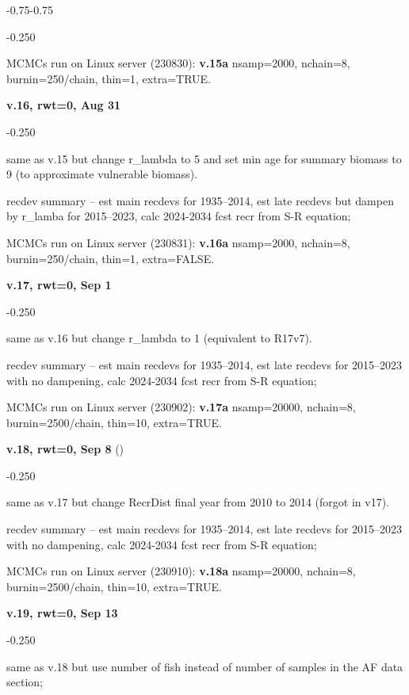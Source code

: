 \begin{itemize_csas}{-0.75}{-0.75}
\begin{itemize_csas}{-0.25}{0}
		\item MCMCs run on Linux server (230830): \textbf{v.15a} nsamp=2000, nchain=8, burnin=250/chain, thin=1, extra=TRUE.
	\end{itemize_csas}
	\item \textbf{v.16, rwt=0, Aug 31}
	\begin{itemize_csas}{-0.25}{0}
		\item same as v.15 but change r\_lambda to 5 and set min age for summary biomass to 9 (to approximate vulnerable biomass).
		\item recdev summary -- est main recdevs for 1935--2014, est late recdevs but dampen by r\_lamba for 2015--2023, calc 2024-2034 fcst recr from S-R equation;
		\item MCMCs run on Linux server (230831): \textbf{v.16a} nsamp=2000, nchain=8, burnin=250/chain, thin=1, extra=FALSE.
	\end{itemize_csas}
	\item \textbf{v.17, rwt=0, Sep 1}
	\begin{itemize_csas}{-0.25}{0}
		\item same as v.16 but change r\_lambda to 1 (equivalent to R17v7).
		\item recdev summary -- est main recdevs for 1935--2014, est late recdevs for 2015--2023 with no dampening, calc 2024-2034 fcst recr from S-R equation;
		\item MCMCs run on Linux server (230902): \textbf{v.17a} nsamp=20000, nchain=8, burnin=2500/chain, thin=10, extra=TRUE.
	\end{itemize_csas}
	\item \textbf{v.18, rwt=0, Sep 8}  ()
	\begin{itemize_csas}{-0.25}{0}
		\item same as v.17 but change RecrDist final year from 2010 to 2014 (forgot in v17).
		\item recdev summary -- est main recdevs for 1935--2014, est late recdevs for 2015--2023 with no dampening, calc 2024-2034 fcst recr from S-R equation;
		\item MCMCs run on Linux server (230910): \textbf{v.18a} nsamp=20000, nchain=8, burnin=2500/chain, thin=10, extra=TRUE.
	\end{itemize_csas}
	\item \textbf{v.19, rwt=0, Sep 13}
	\begin{itemize_csas}{-0.25}{0}
		\item same as v.18 but use number of fish instead of number of samples in the AF data section;
		\item {}
	\end{itemize_csas}
\end{itemize_csas}

